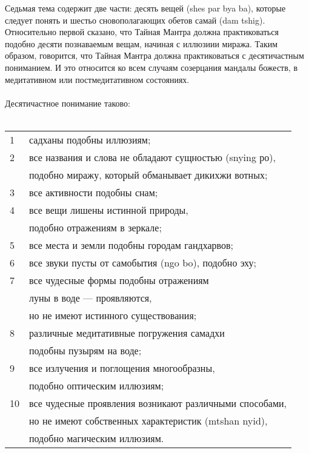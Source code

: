 Седьмая тема содержит две части: десять вещей (shes par bya ba), которые следует
понять и шестьо сновополагающих обетов самай (dam tshig). Относительно первой сказано,
что Тайная Мантра должна практиковаться подобно десяти познаваемым вещам, начиная с
иллюзиии миража. Таким образом, говорится, что Тайная Мантра должна практиковаться с
десятичастным пониманием. И это относится ко всем случаям созерцания мандалы божеств,
в медитативном или постмедитативном состояниях.\\
\\
Десятичастное понимание таково:\\
\\
\begin{tabular}{ll}
 1 & садханы подобны иллюзиям;\\
 2 & все названия и слова не обладают сущностью (snying ро),\\
   & подобно миражу, который обманывает дикихжи вотных;\\
 3 & все активности подобны снам;\\
 4 & все вещи лишены истинной природы, \\
   & подобно отражениям в зеркале;\\
 5 & все места и земли подобны городам гандхарвов;\\
 6 & все звуки пусты от самобытия (ngo bo), подобно эху;\\
 7 & все чудесные формы подобны отражениям \\
   & луны в воде — проявляются, \\
   & но не имеют истинного существования;\\
 8 & различные медитативные погружения самадхи \\
   & подобны пузырям на воде;\\
 9 & все излучения и поглощения многообразны, \\
   & подобно оптическим иллюзиям;\\
10 & все чудесные проявления возникают различными способами,\\
   & но не имеют собственных характеристик (mtshan nyid), \\
   & подобно магическим иллюзиям.\\
\end{tabular}

